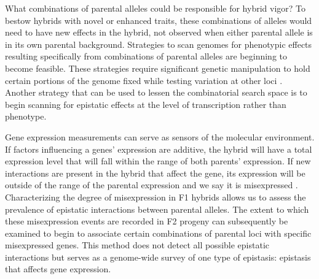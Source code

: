 

What combinations of parental alleles could be responsible for hybrid vigor? To bestow hybrids with novel or enhanced traits, these combinations of alleles would need to have new effects in the hybrid, not observed when either parental allele is in its own parental background. Strategies to scan genomes for phenotypic effects resulting specifically from combinations of parental alleles are beginning to become feasible. These strategies require significant genetic manipulation to hold certain portions of the genome fixed while testing variation at other loci \cite{Buzby2025}. Another strategy that can be used to lessen the combinatorial search space is to begin scanning for epistatic effects at the level of transcription rather than phenotype.


Gene expression measurements can serve as sensors of the molecular environment. If factors influencing a genes' expression are additive, the hybrid will have a total expression level that will fall within the range of both parents' expression. If new interactions are present in the hybrid that affect the gene, its expression will be outside of the range of the parental expression and we say it is misexpressed \cite{Landry2005}. Characterizing the degree of misexpression in F1 hybrids allows us to assess the prevalence of epistatic interactions between parental alleles. The extent to which these misexpression events are recorded in F2 progeny can subsequently be examined to begin to associate certain combinations of parental loci with specific misexpressed genes. This method does not detect all possible epistatic interactions but serves as a genome-wide survey of one type of epistasis: epistasis that affects gene expression.

